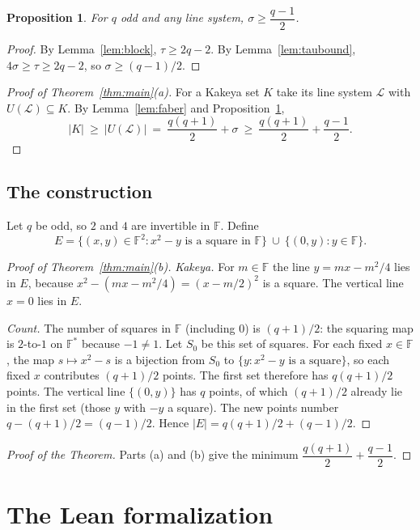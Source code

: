\documentclass[11pt,a4paper]{article}
\newtheorem{proposition}[theorem]{Proposition}
\theoremstyle{definition}
\theoremstyle{remark}
\newcommand{\F}{\mathbb{F}}
\newcommand{\Lset}{\mathcal{L}}
\begin{document}
\begin{proposition}\label{prop:sigma}
For $q$ odd and any line system, $\sigma\ge\dfrac{q-1}{2}$.
\end{proposition}

\begin{proof}
By Lemma~\ref{lem:block}, $\tau\ge 2q-2$. By Lemma~\ref{lem:taubound}, $4\sigma\ge\tau\ge2q-2$, so
$\sigma\ge(q-1)/2$.
\end{proof}

\begin{proof}[Proof of Theorem~\ref{thm:main}(a)]
For a Kakeya set $K$ take its line system $\Lset$ with $U(\Lset)\subseteq K$. By
Lemma~\ref{lem:faber} and Proposition~\ref{prop:sigma},
\[
|K|\ \ge\ |U(\Lset)|\ =\ \frac{q(q+1)}{2}+\sigma\ \ge\ \frac{q(q+1)}{2}+\frac{q-1}{2}.
\]
\end{proof}

\subsection{The construction}

Let $q$ be odd, so $2$ and $4$ are invertible in $\F$. Define
\[
E=\{(x,y)\in\F^2: x^2-y\text{ is a square in }\F\}\ \cup\ \{(0,y): y\in\F\}.
\]

\begin{proof}[Proof of Theorem~\ref{thm:main}(b)]
\emph{Kakeya.} For $m\in\F$ the line $y=mx-m^2/4$ lies in $E$, because
$x^2-(mx-m^2/4)=(x-m/2)^2$ is a square. The vertical line $x=0$ lies in $E$.

\emph{Count.} The number of squares in $\F$ (including $0$) is $(q+1)/2$: the squaring map is
$2$-to-$1$ on $\F^*$ because $-1\ne1$. Let $S_0$ be this set of squares. For each fixed $x\in\F$,
the map $s\mapsto x^2-s$ is a bijection from $S_0$ to $\{y: x^2-y\text{ is a square}\}$, so each
fixed $x$ contributes $(q+1)/2$ points. The first set therefore has $q(q+1)/2$ points. The vertical
line $\{(0,y)\}$ has $q$ points, of which $(q+1)/2$ already lie in the first set (those $y$ with $-y$
a square). The new points number $q-(q+1)/2=(q-1)/2$. Hence
$|E|=q(q+1)/2+(q-1)/2$.
\end{proof}

\begin{proof}[Proof of the Theorem]
Parts (a) and (b) give the minimum $\dfrac{q(q+1)}{2}+\dfrac{q-1}{2}$.
\end{proof}

\section{The Lean formalization}
\end{document}
